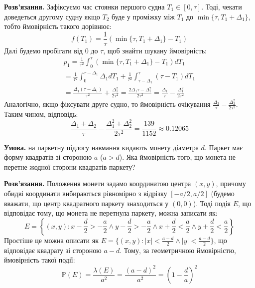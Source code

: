 \documentclass[oneside,solution]{karazin-prob-theory-assign}
\begin{document}
\textbf{Розв'язання.} Зафіксуємо час стоянки першого судна $T_1 \in [0,\tau]$. Тоді, чекати доведеться другому судну якщо $T_2$ буде у проміжку між $T_1$ до $\min\{\tau,T_1+\Delta_1\}$, тобто ймовірність такого дорівнює:
\begin{equation}
   f(T_1)=\frac{1}{\tau}\left(\min\{\tau,T_1+\Delta_1\}- T_1\right)
\end{equation}
Далі будемо пробігати від $0$ до $\tau$, щоб знайти шукану ймовірність:
\begin{gather}
    p_1 = \frac{1}{\tau^2}\int_0^{\tau}\left(\min\{\tau,T_1+\Delta_1\}- T_1\right)dT_1 \nonumber \\
    = \frac{1}{\tau^2}\int_0^{\tau-\Delta_1}\Delta_1 dT_1 + \frac{1}{\tau^2}\int_{\tau-\Delta_1}^{\tau}(\tau-T_1)dT_1 \\
    = \frac{\Delta_1(\tau-\Delta_1)}{\tau^2} + \frac{\Delta_1^2}{2\tau^2} = \frac{2\Delta_1\tau - \Delta_1^2}{2\tau^2} = \frac{\Delta_1}{\tau} - \frac{\Delta_1^2}{2\tau^2}
\end{gather}
Аналогічно, якщо фіксувати друге судно, то ймовірність очікування $\frac{\Delta_2}{\tau} - \frac{\Delta_2^2}{2\tau^2}$. Таким чином, відповідь:
\begin{equation}
    \frac{\Delta_1+\Delta_2}{\tau} - \frac{\Delta_1^2+\Delta_2^2}{2\tau^2} = \frac{139}{1152} \approx \boxed{0.12065}
\end{equation}


\hspace{20px}\textbf{Умова.} на паркетну підлогу навмання кидають монету діаметра $d$. Паркет має форму квадратів зі стороною $a$ ($a > d$). Яка ймовірність того, що монета не перетне жодної сторони квадратів паркету?

\textbf{Розв'язання.} Положення монети задамо координатою центра $(x,y)$, причому обидві координати вибираються рівномірно з відрізку $[-a/2,a/2]$ (будемо вважати, що центр квадратного паркету знаходиться у $(0,0)$). Тоді подія $E$, що відповідає тому, що монета не перетнула паркету, можна записати як:
\begin{equation}
    E = \left\{(x,y): x-\frac{d}{2}>-\frac{a}{2} \wedge y - \frac{d}{2} > -\frac{a}{2} \wedge x + \frac{d}{2} < \frac{a}{2} \wedge y + \frac{d}{2} < \frac{a}{2}\right\}
\end{equation}
Простіше це можна описати як $E=\{(x,y): \left|x\right| < \frac{a-d}{2} \wedge |y|<\frac{a-d}{2}\}$, що відповідає квадрату зі стороною $a-d$. Тому, за геометричною ймовірністю, ймовірність такої події:
\begin{equation}
    \mathbb{P}(E) = \frac{\lambda(E)}{a^2} = \frac{(a-d)^2}{a^2} = \boxed{\left(1 - \frac{d}{a}\right)^2}
\end{equation}
\end{document}

